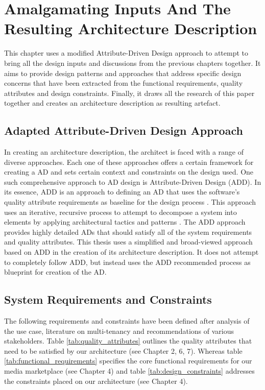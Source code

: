 \chapter{Amalgamating Inputs And The Resulting Architecture Description}
This chapter uses a modified Attribute-Driven Design approach to attempt to bring all the design inputs and discussions from the previous chapters together. It aims to provide  design patterns and approaches that address specific design concerns  that have been extracted from the functional requirements,  quality attributes and design constraints. Finally, it draws all the research of this paper together and creates an architecture description as resulting artefact.

\section{Adapted Attribute-Driven Design Approach}
 \label{sec:add} 
In creating an architecture description, the architect is faced with a range of diverse approaches. Each one of these approaches offers a certain framework for creating a AD and sets certain context and constraints on the design used. One such comprehensive approach to AD design is Attribute-Driven Design (ADD). In its essence, ADD is an approach to defining an AD that uses the software's quality attribute requirements as baseline for the design process \cite{Wojcik2006}. This approach uses an iterative, recursive process to attempt to decompose a system into elements by applying architectural tactics and patterns \cite{Wojcik2006}. The ADD approach provides highly detailed ADs that should satisfy all of the system requirements and quality attributes. This thesis uses a simplified and broad-viewed approach based on ADD in the creation of its architecture description. It does not attempt to completely follow ADD, but instead uses the ADD recommended process as blueprint for creation of the AD.

\section{System Requirements and Constraints}
\label{sec:reqandconstraints}
The following requirements and constraints have been defined after analysis of the use case, literature on multi-tenancy and recommendations of various stakeholders. Table \ref{tab:quality_attributes} outlines the quality attributes that need to be satisfied by our architecture (see Chapter 2, 6, 7). Whereas table \ref{tab:functional_requirements} specifies the core functional requirements for our media marketplace  (see Chapter 4) and table \ref{tab:design_constraints} addresses the constraints placed on our architecture  (see Chapter 4). 


